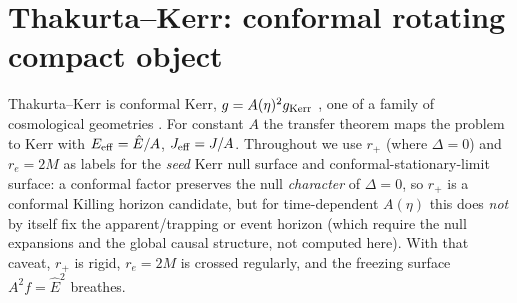 \documentclass[12pt]{iopart}
\newcommand{\Ehat}{\hat E}
\newcommand{\rp}{r_{+}}
\newcommand{\re}{r_{e}}
\begin{document}
\section{Thakurta--Kerr: conformal rotating compact object}
\label{sec:thakurta}
Thakurta--Kerr is conformal Kerr, $g=A(\eta)^2 g_{\rm Kerr}$
\cite{Thakurta1981,Kerr1963}, one of a family of cosmological geometries
\cite{McVittie1933,SultanaDyer2005,Kaloper2010,NolanMcVittie1998,MelloMaciel2017,FaraoniBook}.
For constant $A$
the transfer theorem maps the problem to Kerr with $E_{\rm eff}=\Ehat/A$,
$J_{\rm eff}=J/A$. Throughout we use $\rp$ (where $\Delta=0$) and $\re=2M$ as
labels for the \emph{seed} Kerr null surface and conformal-stationary-limit surface:
a conformal factor preserves the null \emph{character} of $\Delta=0$, so $\rp$ is a
conformal Killing horizon candidate, but for time-dependent $A(\eta)$ this does
\emph{not} by itself fix the apparent/trapping or event horizon (which require the
null expansions and the global causal structure, not computed here). With that
caveat, $\rp$ is rigid, $\re=2M$ is crossed regularly, and the freezing surface
$A^2 f=\Ehat^2$ breathes.
\end{document}
